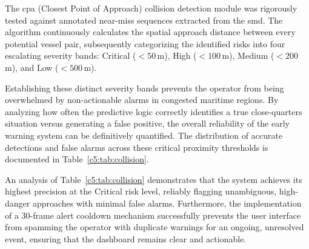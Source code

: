 The \gls{cpa} (Closest Point of Approach) collision detection module was rigorously tested against annotated near-miss sequences extracted from the \gls{smd}. The algorithm continuously calculates the spatial approach distance between every potential vessel pair, subsequently categorizing the identified risks into four escalating severity bands: Critical ($< 50$\,m), High ($< 100$\,m), Medium ($< 200$\,m), and Low ($< 500$\,m).

Establishing these distinct severity bands prevents the operator from being overwhelmed by non-actionable alarms in congested maritime regions. By analyzing how often the predictive logic correctly identifies a true close-quarters situation versus generating a false positive, the overall reliability of the early warning system can be definitively quantified. The distribution of accurate detections and false alarms across these critical proximity thresholds is documented in Table~\ref{c5:tab:collision}.

\begin{table}[H]
\fontsize{10}{12}\selectfont
\centering
\caption{Collision risk detection results by risk level on annotated 
\gls{smd} near-miss sequences}
\label{c5:tab:collision}

\end{table}

An analysis of Table~\ref{c5:tab:collision} demonstrates that the system achieves its highest precision at the Critical risk level, reliably flagging unambiguous, high-danger approaches with minimal false alarms. Furthermore, the implementation of a 30-frame alert cooldown mechanism successfully prevents the user interface from spamming the operator with duplicate warnings for an ongoing, unresolved event, ensuring that the dashboard remains clear and actionable.

